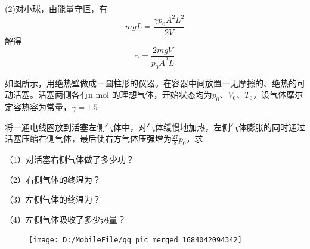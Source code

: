 \documentclass[lang=cn,10pt]{elegantbook}
\begin{document}
\begin{solution}
		(2)对小球，由能量守恒，有
		\begin{equation*}
			mgL=\frac{\gamma p_{0}A^{2}L^{2}}{2V}
		\end{equation*}
		解得
		\begin{equation*}
			\gamma=\frac{2mgV}{p_{0}A^{2}L}
		\end{equation*}
	\end{solution}
	\begin{example}
		如图所示，用绝热壁做成一圆柱形的仪器。在容器中间放置一无摩擦的、绝热的可动活塞。活塞两侧各有n mol 的理想气体，开始状态均为$p_{0}$、$V_{0}$、$T_{0}$，设气体摩尔定容热容为常量，$\gamma=1.5$
		
		将一通电线圈放到活塞左侧气体中，对气体缓慢地加热，左侧气体膨胀的同时通过活塞压缩右侧气体，最后使右方气体压强增为$\frac{27}{8}p_{0}$，求
		
		（1）对活塞右侧气体做了多少功？
		
		（2）右侧气体的终温为？
		
		（3）左侧气体的终温为？
		
		（4）左侧气体吸收了多少热量？
	\end{example}
	\begin{figure}[H]
		\centering
		\texttt{[image: D:/MobileFile/qq\_pic\_merged\_1684042094342]}
		\caption{}
		\label{fig:qqpicmerged1684042094342}
	\end{figure}
\end{document}
